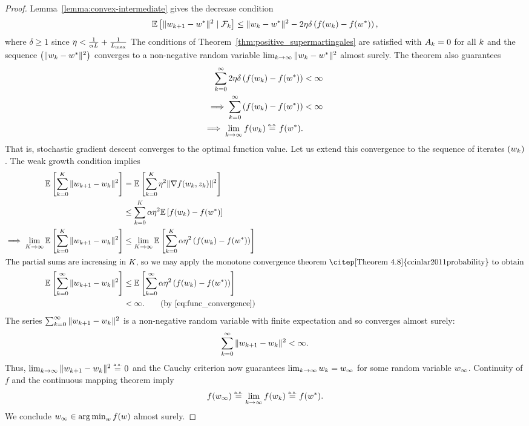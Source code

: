 \wgcAlmostSure*
\begin{proof}
    Lemma~\ref{lemma:convex-intermediate} gives the decrease condition
    \begin{align*}
        \mathbb{E}\left[\|w_{k+1} - w^*\|^2 \mid \mathcal{F}_k\right] \leq  \|w_k - w^*\|^2 - 2 \eta \delta \left(f(w_k) - f(w^*)\right),
    \end{align*}
    where \( \delta \geq 1 \) since \( \eta < \frac{1}{\alpha L} + \frac{1}{L_{\text{max}}} \)
    The conditions of Theorem~\ref{thm:positive_supermartingales} are satisfied with \( A_k = 0 \) for all \( k \) and the sequence \( \left(\|w_k - w^*\|^2\right) \) converges to a non-negative random variable \(\lim_{k \rightarrow \infty} \|w_k - w^*\|^2 \) almost surely.
    The theorem also guarantees
    \begin{align}
        \sum_{k=0}^{\infty} 2\eta \delta \left(f(w_k) - f(w^*)\right) &< \infty \nonumber \\
        \implies \sum_{k=0}^{\infty} \left(f(w_k) - f(w^*)\right) &< \infty~\label{eq:func_convergence}\\
        \implies \lim_{k \rightarrow \infty} f(w_k) \stackrel{\text{\rm\tiny a.s.}}{=} f(w^*). \nonumber
    \end{align}
    That is, stochastic gradient descent converges to the optimal function value. 
\iflong
    Let us extend this convergence to the sequence of iterates \( \left(w_k\right) \).
    The weak growth condition implies 
    \begin{align*}
        \E\sbr{\sum_{k=0}^{K} \norm{\wkk - \wk}^2} &= \E\sbr{\sum_{k=0}^{K} \eta^2 \norm{\grad(\wk, \zk)}^2}\\
                                                   &\leq \sum_{k=0}^{K} \wgc \eta^2 \E\sbr{f(\wk) - f(\wopt)}\\
        \implies \lim_{K\rightarrow \infty} \E \sbr{\sum_{k=0}^{K} \norm{\wkk - \wk}^2} &\leq \lim_{K\rightarrow\infty} \E \sbr{\sum_{k=0}^{K} \wgc \eta^2 \rbr{f(\wk) - f(\wopt)}}\\
        \intertext{The partial sums are increasing in \( K \), so we may apply the monotone convergence theorem~\citep[Theorem 4.8]{ccinlar2011probability} to obtain} 
        \E \sbr{\sum_{k=0}^{\infty} \norm{\wkk - \wk}^2} &\leq  \E \sbr{\sum_{k=0}^{\infty} \wgc \eta^2 \rbr{f(\wk) - f(\wopt)}}\\
                                                                  &< \infty. \tag{by \autoref{eq:func_convergence}}
    \end{align*}
    The series \(  \sum_{k=0}^{\infty} \|w_{k+1} - w_k\|^2 \) is a non-negative random variable with finite expectation and so converges almost surely: 
    \[ \sum_{k=0}^{\infty} \|w_{k+1} - w_k\|^2 < \infty. \]
    Thus, \( \lim_{k \rightarrow \infty} \|w_{k+1} - w_k\|^2 \stackrel{\text{\rm\tiny a.s.}}{=} 0 \) and the Cauchy criterion now guarantees \( \lim_{k \rightarrow \infty} w_k = w_\infty \) for some random variable \( w_\infty \).
    Continuity of \( f \) and the continuous mapping theorem imply 
    \[ f(w_\infty) \stackrel{\text{\rm\tiny a.s.}}{=} \lim_{k\rightarrow \infty} f(w_k) \stackrel{\text{\rm\tiny a.s.}}{=} f(w^*). \]
    We conclude \( w_\infty \in \mathop{\rm arg\,min}_w f(w) \) almost surely.
\fi
\end{proof}

